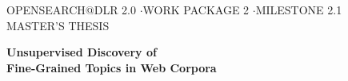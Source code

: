 \begin{titlepage}
\centering
\vspace*{1.8cm}

{\footnotesize\sffamily\textcolor{accent}%
{OPENSEARCH@DLR 2.0 \quad$\cdot$\quad WORK PACKAGE 2 \quad$\cdot$\quad MILESTONE 2.1}}\\[0.35cm]
{\footnotesize\sffamily\textcolor{accent}{MASTER'S THESIS}}\\[1.5cm]

{\LARGE\bfseries Unsupervised Discovery of\\[0.25cm]
Fine-Grained Topics in Web Corpora\par}
\vfill
\end{titlepage}
